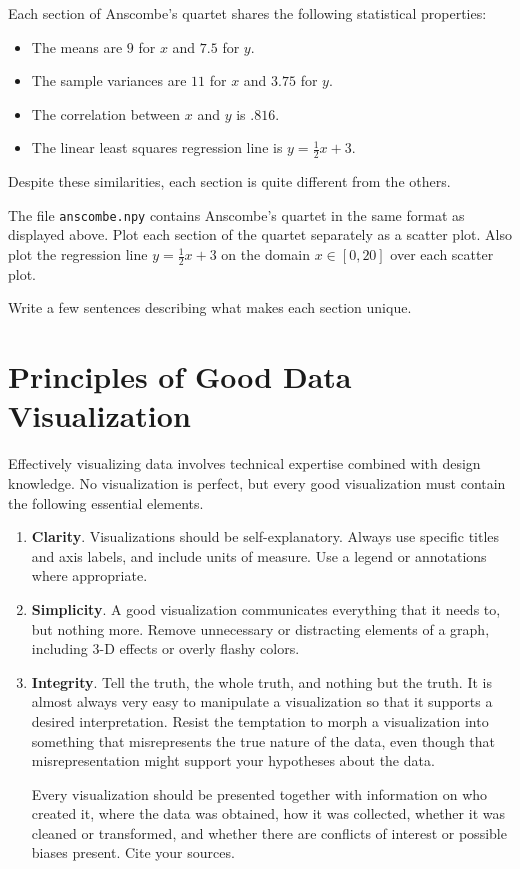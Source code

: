 Each section of Anscombe's quartet shares the following statistical properties:
\begin{itemize}
\setlength\itemsep{0em}
    \item The means are $9$ for $x$ and $7.5$ for $y$.
    \item The sample variances are $11$ for $x$ and $3.75$ for $y$.
    \item The correlation between $x$ and $y$ is $.816$.
    \item The linear least squares regression line is $y=\frac{1}{2}x+3$.
\end{itemize}

Despite these similarities, each section is quite different from the others.

\begin{problem} %
The file \texttt{anscombe.npy} contains Anscombe's quartet in the same format as displayed above.
Plot each section of the quartet separately as a scatter plot.
Also plot the regression line $y = \frac{1}{2}x + 3$ on the domain $x\in[0,20]$ over each scatter plot.

Write a few sentences describing what makes each section unique.
\label{prob:anscombes-quartet}
\end{problem}

\section*{Principles of Good Data Visualization} %

Effectively visualizing data involves technical expertise combined with design knowledge.
No visualization is perfect, but every good visualization must contain the following essential elements.

\begin{enumerate}
    \item \textbf{Clarity}.
    Visualizations should be self-explanatory.
    Always use specific titles and axis labels, and include units of measure.
    Use a legend or annotations where appropriate.

    \item \textbf{Simplicity}.
    A good visualization communicates everything that it needs to, but nothing more.
    Remove unnecessary or distracting elements of a graph, including 3-D effects or overly flashy colors.

    \item \textbf{Integrity}.
    Tell the truth, the whole truth, and nothing but the truth.
    It is almost always very easy to manipulate a visualization so that it supports a desired interpretation.
    Resist the temptation to morph a visualization into something that misrepresents the true nature of the data, even though that misrepresentation might support your hypotheses about the data.

    Every visualization should be presented together with information on who created it, where the data was obtained, how it was collected, whether it was cleaned or transformed, and whether there are conflicts of interest or possible biases present.
    Cite your sources.
\end{enumerate}

